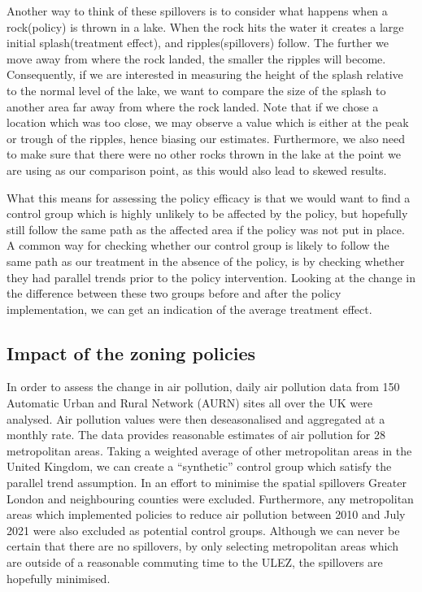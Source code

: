 \documentclass[
]{article}
\begin{document}
Another way to think of these spillovers is to consider what happens
when a rock(policy) is thrown in a lake. When the rock hits the water it
creates a large initial splash(treatment effect), and
ripples(spillovers) follow. The further we move away from where the rock
landed, the smaller the ripples will become. Consequently, if we are
interested in measuring the height of the splash relative to the normal
level of the lake, we want to compare the size of the splash to another
area far away from where the rock landed. Note that if we chose a
location which was too close, we may observe a value which is either at
the peak or trough of the ripples, hence biasing our estimates.
Furthermore, we also need to make sure that there were no other rocks
thrown in the lake at the point we are using as our comparison point, as
this would also lead to skewed results.

What this means for assessing the policy efficacy is that we would want
to find a control group which is highly unlikely to be affected by the
policy, but hopefully still follow the same path as the affected area if
the policy was not put in place. A common way for checking whether our
control group is likely to follow the same path as our treatment in the
absence of the policy, is by checking whether they had parallel trends
prior to the policy intervention. Looking at the change in the
difference between these two groups before and after the policy
implementation, we can get an indication of the average treatment
effect.

\hypertarget{impact-of-the-zoning-policies}{%
\subsection{Impact of the zoning
policies}\label{impact-of-the-zoning-policies}}

In order to assess the change in air pollution, daily air pollution data
from 150 Automatic Urban and Rural Network (AURN) sites all over the UK
were analysed. Air pollution values were then deseasonalised and
aggregated at a monthly rate. The data provides reasonable estimates of
air pollution for 28 metropolitan areas. Taking a weighted average of
other metropolitan areas in the United Kingdom, we can create a
``synthetic'' control group which satisfy the parallel trend assumption.
In an effort to minimise the spatial spillovers Greater London and
neighbouring counties were excluded. Furthermore, any metropolitan areas
which implemented policies to reduce air pollution between 2010 and July
2021 were also excluded as potential control groups. Although we can
never be certain that there are no spillovers, by only selecting
metropolitan areas which are outside of a reasonable commuting time to
the ULEZ, the spillovers are hopefully minimised.
\end{document}
